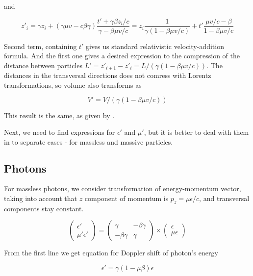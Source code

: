 and

\begin{equation}
	z'_i=\gamma z_i +(\gamma \mu v - c\beta \gamma)\frac{t'+\gamma\beta z_i/c}{\gamma - \beta \mu v/c}=z_i\frac{1}{\gamma(1-\beta\mu v/c)} + t'\frac{\mu v/c - \beta}{1 - \beta \mu v/c}
\end{equation}

Second term, containing $t'$ gives us standard  relativistic velocity-addition formula. And the first one gives a desired expression to the compression of the distance between particles $L' = z'_{i+1}-z'_i = L/(\gamma(1-\beta\mu v/c))$. The distances in the transversal directions does not comress with Lorentz transformations, so volume also transforms as

\begin{equation} \label{volume}
V' = V/(\gamma(1-\beta\mu v/c))
\end{equation}

This result is the same, as given by \cite{LandauLifshitz2}.

Next, we need to find expressions for $\epsilon'$ and $\mu'$, but it is better to deal with them in to separate cases - for massless and massive particles.

\subsection{Photons}
For massless photons, we consider transformation of energy-momentum vector, taking into account that $z$ component of momentum is $p_z = \mu \epsilon/c$, and transversal components stay constant.

\begin{equation}\label{lorentz_ph}
	\left(\begin{array}{c}
		\epsilon'\\
		\mu'\epsilon'
	\end{array}
	\right)
	= \left(
	\begin{array}{cc}
		\gamma & -\beta\gamma\\
		-\beta\gamma & \gamma
	\end{array}
	\right)
	\times
	\left(\begin{array}{c}
		\epsilon\\
		\mu\epsilon
	\end{array}
	\right)
\end{equation}

From the first line we get equation for Doppler shift of photon's energy

\begin{equation}\label{doppler_ph}
	\epsilon'=\gamma(1-\mu\beta)\epsilon
\end{equation}

